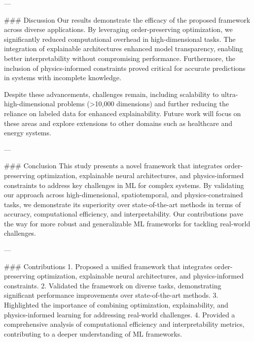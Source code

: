---

### Discussion
Our results demonstrate the efficacy of the proposed framework across diverse applications. By leveraging order-preserving optimization, we significantly reduced computational overhead in high-dimensional tasks. The integration of explainable architectures enhanced model transparency, enabling better interpretability without compromising performance. Furthermore, the inclusion of physics-informed constraints proved critical for accurate predictions in systems with incomplete knowledge.

Despite these advancements, challenges remain, including scalability to ultra-high-dimensional problems (>10,000 dimensions) and further reducing the reliance on labeled data for enhanced explainability. Future work will focus on these areas and explore extensions to other domains such as healthcare and energy systems.

---

### Conclusion
This study presents a novel framework that integrates order-preserving optimization, explainable neural architectures, and physics-informed constraints to address key challenges in ML for complex systems. By validating our approach across high-dimensional, spatiotemporal, and physics-constrained tasks, we demonstrate its superiority over state-of-the-art methods in terms of accuracy, computational efficiency, and interpretability. Our contributions pave the way for more robust and generalizable ML frameworks for tackling real-world challenges.

---

### Contributions
1. Proposed a unified framework that integrates order-preserving optimization, explainable neural architectures, and physics-informed constraints.
2. Validated the framework on diverse tasks, demonstrating significant performance improvements over state-of-the-art methods.
3. Highlighted the importance of combining optimization, explainability, and physics-informed learning for addressing real-world challenges.
4. Provided a comprehensive analysis of computational efficiency and interpretability metrics, contributing to a deeper understanding of ML frameworks.
